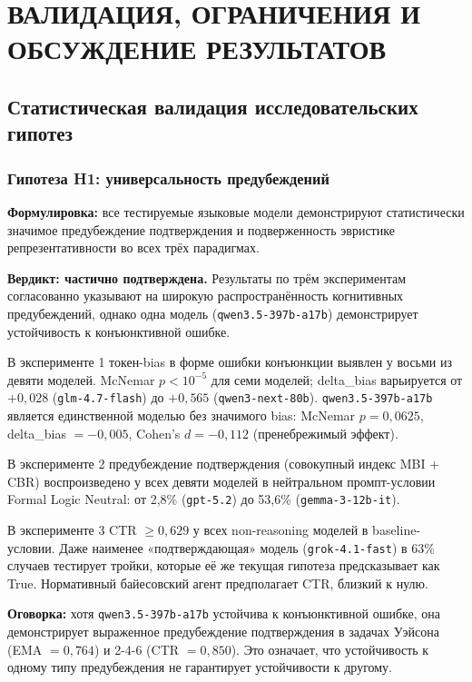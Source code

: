 \chapter{ВАЛИДАЦИЯ, ОГРАНИЧЕНИЯ И ОБСУЖДЕНИЕ РЕЗУЛЬТАТОВ}

\section{Статистическая валидация исследовательских гипотез}

\subsection{Гипотеза H1: универсальность предубеждений}

\textbf{Формулировка:} все тестируемые языковые модели демонстрируют статистически значимое предубеждение подтверждения и подверженность эвристике репрезентативности во всех трёх парадигмах.

\textbf{Вердикт: частично подтверждена.} Результаты по трём экспериментам согласованно указывают на широкую распространённость когнитивных предубеждений, однако одна модель (\texttt{qwen3.5-397b-a17b}) демонстрирует устойчивость к конъюнктивной ошибке.

В эксперименте 1 токен-bias в форме ошибки конъюнкции выявлен у восьми из девяти моделей. McNemar $p < 10^{-5}$ для семи моделей; delta\_bias варьируется от $+0{,}028$ (\texttt{glm-4.7-flash}) до $+0{,}565$ (\texttt{qwen3-next-80b}). \texttt{qwen3.5-397b-a17b} является единственной моделью без значимого bias: McNemar $p = 0{,}0625$, delta\_bias $= -0{,}005$, Cohen's $d = -0{,}112$ (пренебрежимый эффект).

В эксперименте 2 предубеждение подтверждения (совокупный индекс MBI + CBR) воспроизведено у всех девяти моделей в нейтральном промпт-условии Formal Logic Neutral: от 2,8\% (\texttt{gpt-5.2}) до 53,6\% (\texttt{gemma-3-12b-it}).

В эксперименте 3 CTR $\geq 0{,}629$ у всех non-reasoning моделей в baseline-условии. Даже наименее «подтверждающая» модель (\texttt{grok-4.1-fast}) в 63\% случаев тестирует тройки, которые её же текущая гипотеза предсказывает как True. Нормативный байесовский агент предполагает CTR, близкий к нулю.

\textbf{Оговорка:} хотя \texttt{qwen3.5-397b-a17b} устойчива к конъюнктивной ошибке, она демонстрирует выраженное предубеждение подтверждения в задачах Уэйсона (EMA $= 0{,}764$) и 2-4-6 (CTR $= 0{,}850$). Это означает, что устойчивость к одному типу предубеждения не гарантирует устойчивости к другому.

